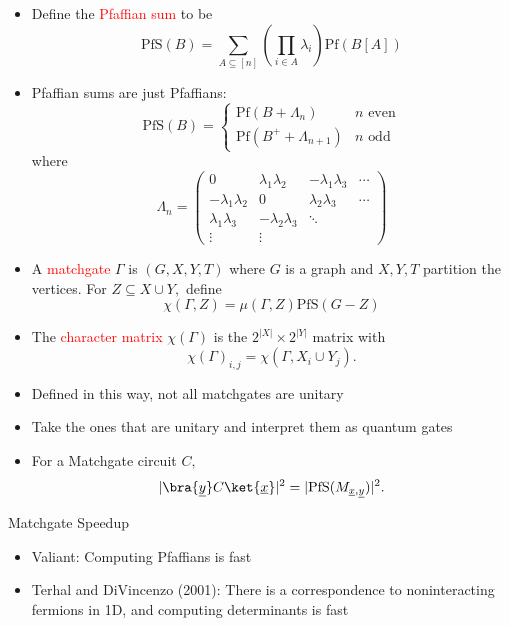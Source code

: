 \documentclass[xcolor=dvipsnames]{beamer}
\begin{document}
\begin{frame}
  \begin{itemize}
    \item Define the \textcolor{red}{Pfaffian sum} to be 
    \[\text{PfS}(B)=\sum_{A\subseteq [n]}\left(\prod_{i\in A}\lambda_i\right)\text{Pf}(B[A])\]
    \item Pfaffian sums are just Pfaffians:
    \[\text{PfS}(B)=
    \begin{cases}
      \text{Pf}(B+\Lambda_n) & n\text{ even}\\
      \text{Pf}(B^++\Lambda_{n+1}) & n\text{ odd}
    \end{cases}\]
    where
    \[\Lambda_n=
    \begin{pmatrix}
      0 & \lambda_1\lambda_2 & -\lambda_1\lambda_3 & \cdots\\
      -\lambda_1\lambda_2 & 0 & \lambda_2\lambda_3 & \cdots\\
      \lambda_1\lambda_3 & -\lambda_2\lambda_3 & \ddots & \\
      \vdots & \vdots & & 
    \end{pmatrix}\]
  \end{itemize}
\end{frame}

\begin{frame}
  \begin{itemize}
    \item A \textcolor{red}{matchgate} $\Gamma$ is $(G,X,Y,T)$ where $G$ is a graph and $X,Y,T$ partition the vertices. For $Z\subseteq X\cup Y,$ define 
    \[\chi(\Gamma,Z)=\mu(\Gamma,Z)\text{PfS}(G-Z)\]
    \item The \textcolor{red}{character matrix} $\chi(\Gamma)$ is the $2^{|X|}\times 2^{|Y|}$ matrix with 
    \[\chi(\Gamma)_{i,j}=\chi(\Gamma,X_i\cup Y_j).\]
    \item Defined in this way, not all matchgates are unitary
    \item Take the ones that are unitary and interpret them as quantum gates
    \item For a Matchgate circuit $C,$ 
    \[|\bra{\underline{y}}C\ket{\underline{x}}|^2=|\text{PfS}(M_{\underline{x},\underline{y}})|^2.\]
  \end{itemize}
\end{frame}

\begin{frame}{Matchgate Speedup}
  \begin{itemize}
    \item Valiant: Computing Pfaffians is fast
    \item Terhal and DiVincenzo (2001): There is a correspondence to noninteracting fermions in 1D, and computing determinants is fast
  \end{itemize}
\end{frame}
\end{document}
